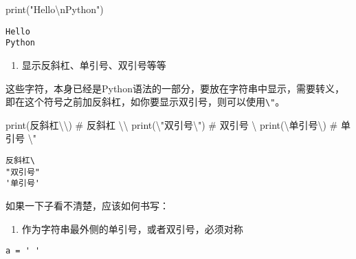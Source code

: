 \documentclass[
  letterpaper,
  DIV=11,
  numbers=noendperiod]{scrreprt}
\newenvironment{Shaded}{\begin{snugshade}}{\end{snugshade}}
\newcommand{\BuiltInTok}[1]{\textcolor[rgb]{0.00,0.23,0.31}{#1}}
\newcommand{\CharTok}[1]{\textcolor[rgb]{0.13,0.47,0.30}{#1}}
\newcommand{\CommentTok}[1]{\textcolor[rgb]{0.37,0.37,0.37}{#1}}
\newcommand{\NormalTok}[1]{\textcolor[rgb]{0.00,0.23,0.31}{#1}}
\newcommand{\StringTok}[1]{\textcolor[rgb]{0.13,0.47,0.30}{#1}}
\providecommand{\tightlist}{%
  \setlength{\itemsep}{0pt}\setlength{\parskip}{0pt}}\usepackage{longtable,booktabs,array}
\begin{document}
\begin{Shaded}
\begin{Highlighting}[]
\BuiltInTok{print}\NormalTok{(}\StringTok{"Hello}\CharTok{\textbackslash{}n}\StringTok{Python"}\NormalTok{)}
\end{Highlighting}
\end{Shaded}

\begin{verbatim}
Hello
Python
\end{verbatim}

\begin{enumerate}
\def\labelenumi{\arabic{enumi}.}
\setcounter{enumi}{1}
\tightlist
\item
  显示反斜杠、单引号、双引号等等
\end{enumerate}

这些字符，本身已经是Python语法的一部分，要放在字符串中显示，需要转义，即在这个符号之前加反斜杠，如你要显示双引号，则可以使用\texttt{\textbackslash{}"}。

\begin{Shaded}
\begin{Highlighting}[]
\BuiltInTok{print}\NormalTok{(}\StringTok{\textquotesingle{}反斜杠}\CharTok{\textbackslash{}\textbackslash{}}\StringTok{\textquotesingle{}}\NormalTok{) }\CommentTok{\# 反斜杠 \textbackslash{}\textbackslash{}}
\BuiltInTok{print}\NormalTok{(}\StringTok{\textquotesingle{}}\CharTok{\textbackslash{}"}\StringTok{双引号}\CharTok{\textbackslash{}"}\StringTok{\textquotesingle{}}\NormalTok{) }\CommentTok{\# 双引号 \textbackslash{}\textquotesingle{}}
\BuiltInTok{print}\NormalTok{(}\StringTok{\textquotesingle{}}\CharTok{\textbackslash{}\textquotesingle{}}\StringTok{单引号}\CharTok{\textbackslash{}\textquotesingle{}}\StringTok{\textquotesingle{}}\NormalTok{) }\CommentTok{\# 单引号 \textbackslash{}"}
\end{Highlighting}
\end{Shaded}

\begin{verbatim}
反斜杠\
"双引号"
'单引号'
\end{verbatim}

如果一下子看不清楚，应该如何书写：

\begin{enumerate}
\def\labelenumi{\arabic{enumi}.}
\tightlist
\item
  作为字符串最外侧的单引号，或者双引号，必须对称
\end{enumerate}

\begin{verbatim}
a = ' '
\end{verbatim}
\end{document}
